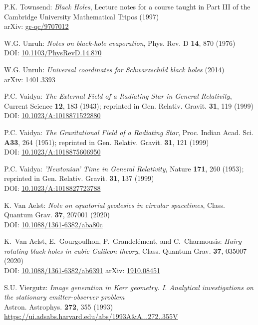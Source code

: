 \begin{thebibliography}{123}
P.K. Townsend: {\em Black Holes}, Lecture notes for a course taught in Part III
of the Cambridge University Mathematical Tripos (1997)\\
arXiv: \href{https://arxiv.org/abs/gr-qc/9707012}{gr-qc/9707012}

W.G. Unruh: {\em Notes on black-hole evaporation},
Phys. Rev. D {\bf 14}, 870 (1976)\\
DOI: \href{https://doi.org/10.1103/PhysRevD.14.870}{10.1103/PhysRevD.14.870}

W.G. Unruh: {\em Universal coordinates for Schwarzschild black holes} (2014)\\
arXiv: \href{https://arxiv.org/abs/1401.3393}{1401.3393}

P.C. Vaidya:
{\em The External Field of a Radiating Star in General Relativity},
Current Science {\bf 12}, 183 (1943);
reprinted in Gen. Relativ. Gravit. {\bf 31}, 119 (1999)\\
DOI: \href{https://doi.org/10.1023/A:1018871522880}{10.1023/A:1018871522880}

P.C. Vaidya:
{\em The Gravitational Field of a Radiating Star},
Proc. Indian Acad. Sci. {\bf A33}, 264 (1951);
reprinted in Gen. Relativ. Gravit. {\bf 31}, 121 (1999)\\
DOI: \href{https://doi.org/10.1023/A:1018875606950}{10.1023/A:1018875606950}

P.C. Vaidya:
{\em 'Newtonian' Time in General Relativity},
Nature {\bf 171}, 260 (1953);
reprinted in Gen. Relativ. Gravit. {\bf 31}, 137 (1999)\\
DOI: \href{https://doi.org/10.1023/A:1018827723788}{10.1023/A:1018827723788}

K. Van Aelst: {\em Note on equatorial geodesics in circular spacetimes},
Class. Quantum Grav. {\bf 37}, 207001 (2020)\\
DOI: \href{https://doi.org/10.1088/1361-6382/aba80c}{10.1088/1361-6382/aba80c}

K.~Van Aelst, E.~Gourgoulhon, P.~Grandclément, and C.~Charmousis:
{\em Hairy rotating black holes in cubic Galileon theory},
Class. Quantum Grav. {\bf 37}, 035007 (2020)\\
DOI: \href{https://doi.org/10.1088/1361-6382/ab6391}{10.1088/1361-6382/ab6391}\hfill
arXiv: \href{https://arxiv.org/abs/1910.08451}{1910.08451}

S.U. Viergutz:
{\em Image generation in Kerr geometry. I. Analytical investigations on the stationary emitter-observer problem}\\
Astron. Astrophys. {\bf 272}, 355 (1993)\\
\url{https://ui.adsabs.harvard.edu/abs/1993A&A...272..355V}


\end{thebibliography}
